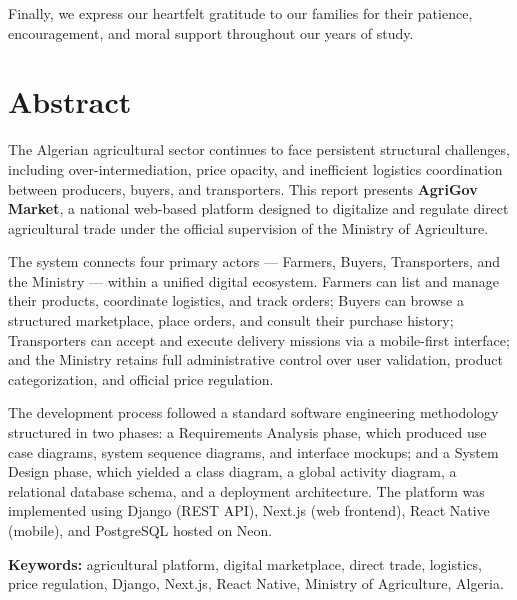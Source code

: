 Finally, we express our heartfelt gratitude to our families for their patience, encouragement, and moral support throughout our years of study.

\newpage
\thispagestyle{empty}
\chapter*{Abstract}

The Algerian agricultural sector continues to face persistent structural challenges, including over-intermediation, price opacity, and inefficient logistics coordination between producers, buyers, and transporters. This report presents \textbf{AgriGov Market}, a national web-based platform designed to digitalize and regulate direct agricultural trade under the official supervision of the Ministry of Agriculture.

The system connects four primary actors — Farmers, Buyers, Transporters, and the Ministry — within a unified digital ecosystem. Farmers can list and manage their products, coordinate logistics, and track orders; Buyers can browse a structured marketplace, place orders, and consult their purchase history; Transporters can accept and execute delivery missions via a mobile-first interface; and the Ministry retains full administrative control over user validation, product categorization, and official price regulation.

The development process followed a standard software engineering methodology structured in two phases: a Requirements Analysis phase, which produced use case diagrams, system sequence diagrams, and interface mockups; and a System Design phase, which yielded a class diagram, a global activity diagram, a relational database schema, and a deployment architecture. The platform was implemented using Django (REST API), Next.js (web frontend), React Native (mobile), and PostgreSQL hosted on Neon.

\vspace{0.5cm}
\noindent\textbf{Keywords:} agricultural platform, digital marketplace, direct trade, logistics, price regulation, Django, Next.js, React Native, Ministry of Agriculture, Algeria.

\newpage
\thispagestyle{empty}
